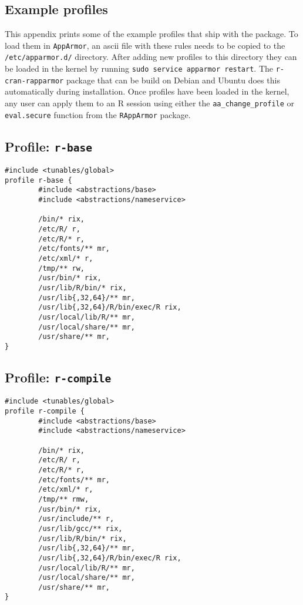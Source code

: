 \documentclass{jss}
\newcommand{\R}{\textsf{R}\xspace}
\newcommand{\AppArmor}{\texttt{AppArmor}\xspace}
\newcommand{\RAppArmor}{\pkg{RAppArmor}\xspace}
\begin{document}
\begin{appendices}
\section{Example profiles}

This appendix prints some of the example profiles that ship with the
\RAppArmor package. To load them in \AppArmor, an ascii file with these
rules needs to be copied to the \texttt{/etc/apparmor.d/} directory. After adding new profiles to this directory they can be loaded in the kernel by running \texttt{sudo service apparmor restart}.
The \texttt{r-cran-rapparmor} package that can be build on Debian and Ubuntu does this automatically during installation.
Once profiles have been loaded in the kernel, any user can apply them to an \R session using either the \texttt{aa\_change\_profile} or \texttt{eval.secure} function from the \texttt{RAppArmor} package.

\subsection[Profile: r-base]{Profile: \texttt{r-base}}
\label{r-base}

\begin{verbatim}
#include <tunables/global>
profile r-base {
        #include <abstractions/base>
        #include <abstractions/nameservice>

        /bin/* rix,
        /etc/R/ r,
        /etc/R/* r,
        /etc/fonts/** mr,
        /etc/xml/* r,
        /tmp/** rw,
        /usr/bin/* rix,
        /usr/lib/R/bin/* rix,
        /usr/lib{,32,64}/** mr,
        /usr/lib{,32,64}/R/bin/exec/R rix,
        /usr/local/lib/R/** mr,
        /usr/local/share/** mr,
        /usr/share/** mr,
}
\end{verbatim}


\subsection[Profile: r-compile]{Profile: \texttt{r-compile}}
\label{r-compile}

\begin{verbatim}
#include <tunables/global>
profile r-compile {
        #include <abstractions/base>
        #include <abstractions/nameservice>

        /bin/* rix,
        /etc/R/ r,
        /etc/R/* r,
        /etc/fonts/** mr,
        /etc/xml/* r,
        /tmp/** rmw,
        /usr/bin/* rix,
        /usr/include/** r,
        /usr/lib/gcc/** rix,		
        /usr/lib/R/bin/* rix,
        /usr/lib{,32,64}/** mr,
        /usr/lib{,32,64}/R/bin/exec/R rix,
        /usr/local/lib/R/** mr,
        /usr/local/share/** mr,
        /usr/share/** mr,
}
\end{verbatim}


\end{appendices}
\end{document}
